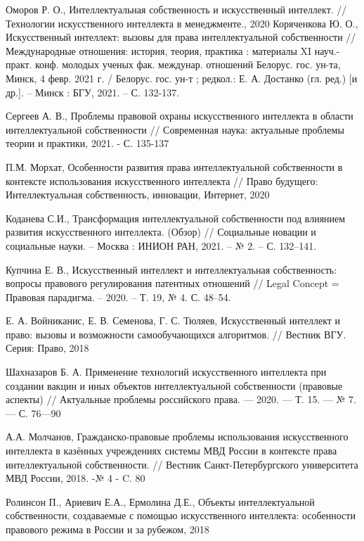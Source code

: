 \begin{thebibliography}{}
Оморов Р. О., Интеллектуальная собственность и искусственный интеллект. // Технологии искусственного
интеллекта в менеджменте., 2020
Коряченкова Ю. О., Искусственный интеллект: вызовы для права интеллектуальной собственности //
Международные отношения: история, теория, практика : материалы XI науч.-практ. конф. молодых
ученых фак. междунар. отношений Белорус. гос. ун-та, Минск, 4 февр. 2021 г. / Белорус. гос. ун-т ;
редкол.: Е. А. Достанко (гл. ред.) [и др.]. – Минск : БГУ, 2021. – С. 132-137.

Сергеев А. В., Проблемы правовой охраны искусственного интеллекта в области
интеллектуальной собственности // Современная наука: актуальные проблемы
теории и практики, 2021. - С. 135-137

П.М. Морхат, Особенности развития права интеллектуальной собственности в
контексте использования искусственного интеллекта // Право будущего: Интеллектуальная собственность, инновации, Интернет,
2020

Коданева С.И., Трансформация интеллектуальной собственности под влиянием развития искусственного интеллекта.
(Обзор) // Социальные новации и социальные науки. – Москва : ИНИОН РАН, 2021. – № 2. – С. 132–141.

Купчина Е. В., Искусственный интеллект и интеллектуальная собственность: вопросы правового регулирования патентных отношений
// Legal Concept = Правовая парадигма. – 2020. – Т. 19, № 4. С. 48–54.

Е. А. Войниканис, Е. В. Семенова, Г. С. Тюляев, Искусственный интеллект и право: вызовы и возможности
самообучающихся алгоритмов. // Вестник ВГУ. Серия: Право, 2018

Шахназаров Б. А. Применение технологий искусственного интеллекта при создании вакцин и иных объектов интеллектуальной
собственности (правовые аспекты) // Актуальные проблемы российского права. — 2020. — Т. 15. — № 7. — С. 76—90

А.А. Молчанов, Гражданско-правовые проблемы использования искусственного интеллекта в казённых учреждениях
системы МВД России в контексте права интеллектуальной собственности. // Вестник Санкт-Петербургского университета
МВД России, 2018. -№ 4 - C. 80

Ролинсон П., Ариевич Е.А., Ермолина Д.Е., Объекты интеллектуальной собственности, создаваемые с помощью
искусственного интеллекта: особенности правового режима в России и за рубежом, 2018

\end{thebibliography}



